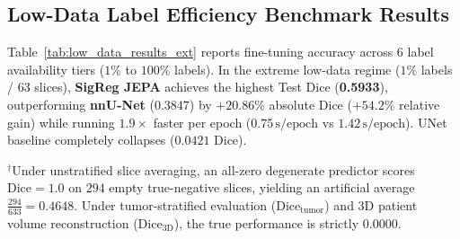 \documentclass{article}
\begin{document}
\subsection{Low-Data Label Efficiency Benchmark Results}

Table~\ref{tab:low_data_results_ext} reports fine-tuning accuracy across 6 label availability tiers ($1\%$ to $100\%$ labels). In the extreme low-data regime ($1\%$ labels / $63$ slices), \textbf{SigReg JEPA} achieves the highest Test Dice (\textbf{0.5933}), outperforming \textbf{nnU-Net} ($0.3847$) by $+20.86\%$ absolute Dice ($+54.2\%$ relative gain) while running $1.9\times$ faster per epoch ($0.75\,\text{s/epoch}$ vs $1.42\,\text{s/epoch}$). UNet baseline completely collapses ($0.0421$ Dice).

\begin{table}[ht]
\centering
\caption{Low-Data Label Efficiency Benchmark across 6 label availability fractions ($1\%$ to $100\%$). Best per column is formatted in \textbf{bold}.}
\label{tab:low_data_results_ext}
\vspace{0.5em}
\vspace{0.3em}
\raggedright{\footnotesize $^\dagger$Under unstratified slice averaging, an all-zero degenerate predictor scores $\text{Dice} = 1.0$ on $294$ empty true-negative slices, yielding an artificial average $\frac{294}{633} = 0.4648$. Under tumor-stratified evaluation ($\text{Dice}_{\text{tumor}}$) and 3D patient volume reconstruction ($\text{Dice}_{\text{3D}}$), the true performance is strictly $0.0000$.}
\end{table}
\end{document}

